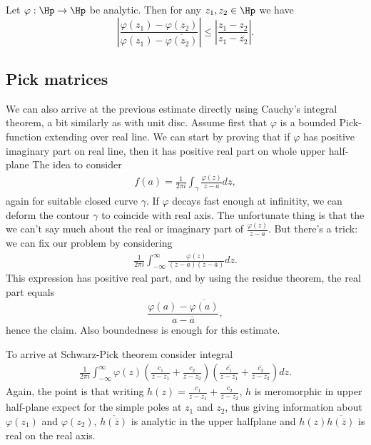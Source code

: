 \begin{lause}
	Let $\varphi : \Hp \to \Hp$ be analytic. Then for any $z_{1}, z_{2} \in \Hp$ we have
	\[
		\left|\frac{\varphi(z_{1}) - \varphi(z_{2})}{\varphi(z_{1}) - \overline{\varphi(z_{2})}} \right| \leq \left|\frac{z_{1} - z_{2}}{z_{1} - \overline{z_{2}}} \right|.
	\]
\end{lause}

\subsection{Pick matrices}

We can also arrive at the previous estimate directly using Cauchy's integral theorem, a bit similarly as with unit disc. Assume first that $\varphi$ is a bounded Pick-function extending over real line. We can start by proving that if $\varphi$ has positive imaginary part on real line, then it has positive real part on whole upper half-plane The idea to consider
\begin{align*}
	f(a) = \frac{1}{2 \pi i}\int_{\gamma} \frac{\varphi(z)}{z - a} dz,
\end{align*}
again for suitable closed curve $\gamma$. If $\varphi$ decays fast enough at infinitity, we can deform the contour $\gamma$ to coincide with real axis. The unfortunate thing is that the we can't say much about the real or imaginary part of $ \frac{\varphi(z)}{z - a}$. But there's a trick: we can fix our problem by considering
\begin{align*}
	\frac{1}{2 \pi i}\int_{-\infty}^{\infty} \frac{\varphi(z)}{(z - a) (z - \overline{a})} dz.
\end{align*}
This expression has positive real part, and by using the residue theorem, the real part equals
\[
	\frac{\varphi(a) - \overline{\varphi(a)}}{a - \overline{a}},
\]
hence the claim. Also boundedness is enough for this estimate.

To arrive at Schwarz-Pick theorem consider integral
\begin{align*}
	\frac{1}{2 \pi i}\int_{-\infty}^{\infty} \varphi(z) \left(\frac{c_{1}}{z - z_{1}} + \frac{c_{2}}{z - z_{2}} \right) \left(\frac{\overline{c_{1}}}{z - \overline{z_{1}}} + \frac{\overline{c_{2}}}{z - \overline{z_{2}}} \right) dz.
\end{align*}
Again, the point is that writing $h(z) = \frac{c_{1}}{z - z_{1}} + \frac{c_{2}}{z - z_{2}}$, $h$ is meromorphic in upper half-plane expect for the simple poles at $z_{1}$ and $z_{2}$, thus giving information about $\varphi(z_{1})$ and $\varphi(z_{2})$, $\overline{h(\overline{z})}$ is analytic in the upper halfplane and $h(z)\overline{h(\overline{z})}$ is real on the real axis.

